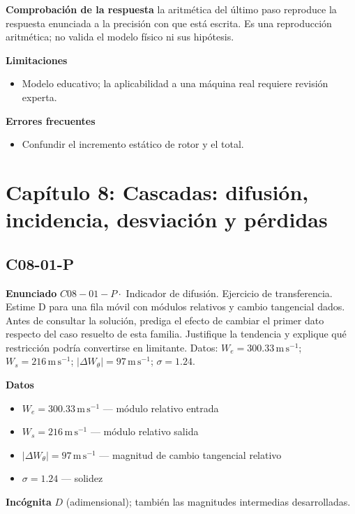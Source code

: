 \documentclass[10pt,openany]{book}
\begin{document}
\noindent\textbf{Comprobación de la respuesta} la aritmética del último paso reproduce la respuesta enunciada a la precisión con que está escrita. Es una reproducción aritmética; no valida el modelo físico ni sus hipótesis.

\noindent\textbf{Limitaciones}
\begin{itemize}
\item Modelo educativo; la aplicabilidad a una máquina real requiere revisión experta.
\end{itemize}

\noindent\textbf{Errores frecuentes}
\begin{itemize}
\item Confundir el incremento estático de rotor y el total.
\end{itemize}
\section{Capítulo 8: Cascadas: difusión, incidencia, desviación y pérdidas}
\subsection*{C08-01-P}

\noindent\textbf{Enunciado}
\(C08-01-P \cdot\) Indicador de difusión. Ejercicio de transferencia. Estime D para una fila móvil con módulos relativos y cambio tangencial dados. Antes de consultar la solución, prediga el efecto de cambiar el primer dato respecto del caso resuelto de esta familia. Justifique la tendencia y explique qué restricción podría convertirse en limitante. Datos: \(W_e=300.33\, \mathrm{m}\,\mathrm{s}^{-1}\); \(W_s=216\, \mathrm{m}\,\mathrm{s}^{-1}\); \(|\Delta W_\theta|=97\, \mathrm{m}\,\mathrm{s}^{-1}\); \(\sigma=1.24\).

\noindent\textbf{Datos}
\begin{itemize}
\item $W_e = 300.33\,\mathrm{m}\,\mathrm{s}^{-1}$ — módulo relativo entrada
\item $W_s = 216\,\mathrm{m}\,\mathrm{s}^{-1}$ — módulo relativo salida
\item $|\Delta W_\theta| = 97\,\mathrm{m}\,\mathrm{s}^{-1}$ — magnitud de cambio tangencial relativo
\item $\sigma = 1.24$ — solidez
\end{itemize}

\noindent\textbf{Incógnita}
$D$ (adimensional); también las magnitudes intermedias desarrolladas.
\end{document}
